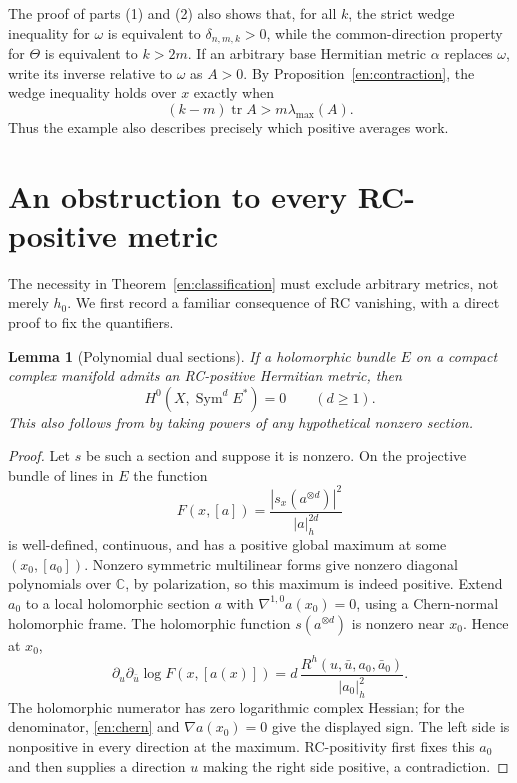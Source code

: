 \documentclass[12pt]{amsart}
\newtheorem{lem}[thm]{Lemma}
\theoremstyle{definition}
\theoremstyle{remark}
\numberwithin{equation}{section}
\DeclareMathOperator{\tr}{tr}
\DeclareMathOperator{\Sym}{Sym}
\newcommand{\C}{\mathbb{C}}
\newcommand{\cst}{\delta_{n,m,k}}
\newcommand{\eref}[1]{\eqref{en:#1}}
\begin{document}
The proof of parts (1) and (2) also shows that, for all $k$, the strict wedge inequality for $\omega$ is equivalent to $\cst>0$, while the common-direction property for $\Theta$ is equivalent to $k>2m$. If an arbitrary base Hermitian metric $\alpha$ replaces $\omega$, write its inverse relative to $\omega$ as $A>0$. By Proposition~\ref{en:contraction}, the wedge inequality holds over $x$ exactly when
\begin{equation}\label{en:allaverages}
(k-m)\tr A>m\lambda_{\max}(A).
\end{equation}
Thus the example also describes precisely which positive averages work.

\section{An obstruction to every RC-positive metric}

The necessity in Theorem~\ref{en:classification} must exclude arbitrary metrics, not merely $h_0$. We first record a familiar consequence of RC vanishing, with a direct proof to fix the quantifiers.

\begin{lem}[Polynomial dual sections]\label{en:vanishing}
If a holomorphic bundle $E$ on a compact complex manifold admits an RC-positive Hermitian metric, then
\[
H^0(X,\Sym^d E^*)=0\qquad(d\ge1).
\]
This also follows from \cite[Theorem~1.3]{en:Y18} by taking powers of any hypothetical nonzero section.
\end{lem}

\begin{proof}
Let $s$ be such a section and suppose it is nonzero. On the projective bundle of lines in $E$ the function
\[
F(x,[a])=\frac{|s_x(a^{\otimes d})|^2}{|a|_h^{2d}}
\]
is well-defined, continuous, and has a positive global maximum at some $(x_0,[a_0])$. Nonzero symmetric multilinear forms give nonzero diagonal polynomials over $\C$, by polarization, so this maximum is indeed positive. Extend $a_0$ to a local holomorphic section $a$ with $\nabla^{1,0}a(x_0)=0$, using a Chern-normal holomorphic frame. The holomorphic function $s(a^{\otimes d})$ is nonzero near $x_0$. Hence at $x_0$,
\begin{equation}\label{en:maxprinciple}
\partial_u\partial_{\bar u}\log F(x,[a(x)])
=d\,\frac{R^h(u,\bar u,a_0,\bar a_0)}{|a_0|_h^2}.
\end{equation}
The holomorphic numerator has zero logarithmic complex Hessian; for the denominator, \eref{chern} and $\nabla a(x_0)=0$ give the displayed sign. The left side is nonpositive in every direction at the maximum. RC-positivity first fixes this $a_0$ and then supplies a direction $u$ making the right side positive, a contradiction.
\end{proof}
\end{document}
